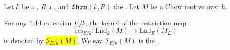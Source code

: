\begin{definition} \label{definition:ideal_of_endomorphisms_for_a_chow_motive_over_a_field_with_coefficients_in_a_commutative_ring}
Let $k$ be a , $R$ a , and $\mathfrak{Chow}(k, R)$ the . Let $M$ be a Chow motive over $k$.

For any field extension $E/k$, the kernel of the restriction map 
$$\mathrm{res}_{E/k}: \mathrm{End}_k(M) \to \mathrm{End}_E(M_E)$$ 
is denoted by \hl{$\mathcal{I}_{E/k}(M)$}. We say $\mathcal{I}_{E/k}(M)$ is the .
\end{definition}